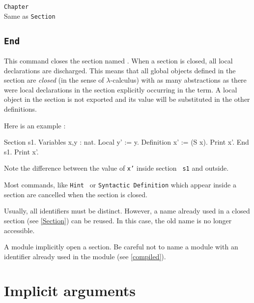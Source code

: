 \begin{coq_example}
\begin{Variants}
\item{\tt Chapter {\ident}}\\
        Same as {\tt Section {\ident}}
\end{Variants}

\subsection{\tt End {\ident}}
This command closes the section named {\ident}. When a section is
closed, all local declarations are discharged. This means that all
global objects defined in the section are {\it closed} (in the sense
of $\lambda$-calculus) with as many abstractions as there were local
declarations in the section explicitly occurring in the term.  A local
object in the section is not exported and its value will be
substituted in the other definitions.

Here is an example :
\begin{coq_example}
Section s1.
Variables x,y : nat.
Local y' := y.
Definition x' := (S x).
Print x'.
End s1.
Print x'.
\end{coq_example}
Note the difference between the value of {\tt x'} inside section {\tt
  s1} and outside.

\begin{ErrMsgs}
\item {}
\item {}
\end{ErrMsgs}

\begin{Remarks}
\item Most commands, like {\tt Hint \ident} or {\tt Syntactic
  Definition} which appear inside a section are cancelled when the
section is closed.
\item Usually, all identifiers must be distinct. 
However, a name already used in a closed section (see \ref{Section})
can be reused. In this case, the old name is no longer accessible.
\item A module implicitly open a section. Be careful not to name a
module with an identifier already used in the module (see \ref{compiled}).
\end{Remarks}

\section{Implicit arguments}


\end{coq_example}
